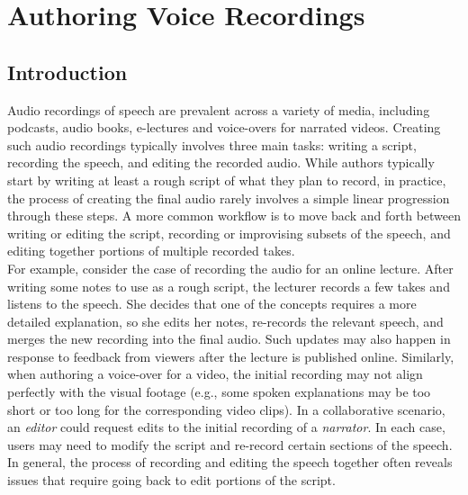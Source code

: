 \newcommand{\voicescript}[0]{VoiceScript}
\chapter{Authoring Voice Recordings} %
\label{ch:voicescript} %

\section{Introduction}
Audio recordings of speech are prevalent across a variety of media, including podcasts, audio books, e-lectures and voice-overs for narrated videos.
%
Creating such audio recordings typically involves three main tasks: writing a script, recording the speech, and editing the recorded audio. 
%
While authors typically start by writing at least a rough script of what they plan to record, in practice, the process of creating the final audio rarely involves a simple linear progression through these steps. A more common workflow is to move back and forth between writing or editing the script, recording or improvising subsets of the speech, and editing together portions of multiple recorded takes.\\

For example, consider the case of recording the audio for an online lecture. After writing some notes to use as a rough script, the lecturer records a few takes and listens to the speech. She decides that one of the concepts requires a more detailed explanation, so she edits her notes, re-records the relevant speech, and merges the new recording into the final audio. Such updates may also happen in response to feedback from viewers after the lecture is published online. Similarly, when authoring a voice-over for a video, the initial recording may not align perfectly with the visual footage (e.g., some spoken explanations may be too short or too long for the corresponding video clips). In a collaborative scenario, an \textit{editor} could request edits to the initial recording of a \textit{narrator}. In each case, users may need to modify the script and re-record certain sections of the speech. In general, the process of recording and editing the speech together often reveals issues that require going back to edit portions of the script.\\

